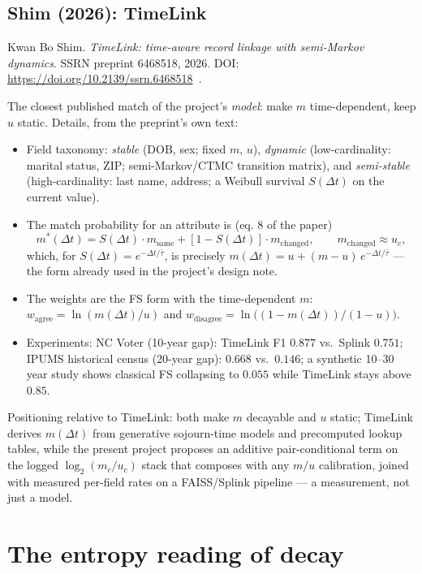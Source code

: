 \documentclass[11pt]{article}
\newcommand{\dt}{\Delta t}
\begin{document}
\subsection{Shim (2026): TimeLink}

Kwan Bo Shim.
\emph{TimeLink: time-aware record linkage with semi-Markov dynamics}.
SSRN preprint 6468518, 2026.
DOI: \url{https://doi.org/10.2139/ssrn.6468518}~\cite{shim2026}.

The closest published match of the project's \emph{model}: make $m$ time-dependent, keep
$u$ static. Details, from the preprint's own text:
\begin{itemize}[leftmargin=*]
  \item Field taxonomy: \emph{stable} (DOB, sex; fixed $m$, $u$), \emph{dynamic}
        (low-cardinality: marital status, ZIP; semi-Markov/CTMC transition matrix), and
        \emph{semi-stable} (high-cardinality: last name, address; a Weibull survival
        $S(\dt)$ on the current value).
  \item The match probability for an attribute is (eq. 8 of the paper)
        \begin{equation}
          m^{*}(\dt) = S(\dt)\cdot m_{\mathrm{same}} + [1-S(\dt)]\cdot
          m_{\mathrm{changed}},\qquad m_{\mathrm{changed}} \approx u_c,
        \end{equation}
        which, for $S(\dt)=e^{-\dt/\bar\tau}$, is precisely
        $m(\dt)=u+(m-u)\,e^{-\dt/\bar\tau}$ --- the form already used in the project's
        design note.
  \item The weights are the FS form with the time-dependent $m$:
        $w_{\mathrm{agree}}=\ln(m(\dt)/u)$ and
        $w_{\mathrm{disagree}}=\ln\bigl((1-m(\dt))/(1-u)\bigr)$.
  \item Experiments: NC Voter (10-year gap): TimeLink F1 $0.877$ vs.\ Splink $0.751$;
        IPUMS historical census (20-year gap): $0.668$ vs.\ $0.146$; a synthetic 10--30
        year study shows classical FS collapsing to $0.055$ while TimeLink stays above
        $0.85$.
\end{itemize}
Positioning relative to TimeLink: both make $m$ decayable and $u$ static; TimeLink derives
$m(\dt)$ from generative sojourn-time models and precomputed lookup tables, while the
present project proposes an additive pair-conditional term on the logged $\log_2(m_c/u_c)$
stack that composes with any $m/u$ calibration, joined with measured per-field rates on a
FAISS/Splink pipeline --- a measurement, not just a model.

\section{The entropy reading of decay}
\end{document}
